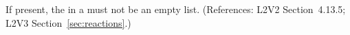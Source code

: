 If present, the  in a \KineticLaw must not
be an empty list.  (References: L2V2 Section~4.13.5; L2V3
Section~\ref{sec:reactions}.)
